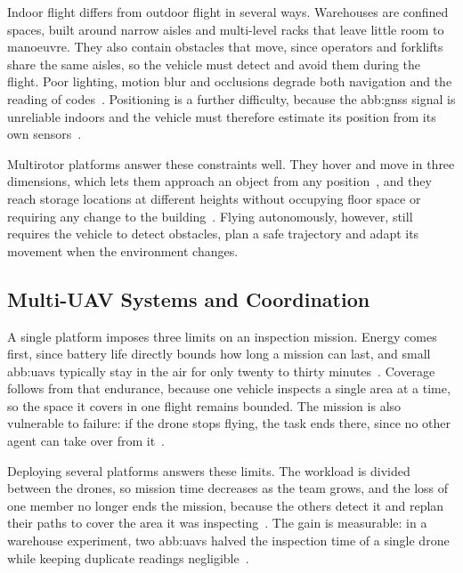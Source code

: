 Indoor flight differs from outdoor flight in several ways. Warehouses are
confined spaces, built around narrow aisles and multi-level racks that leave
little room to manoeuvre. They also contain obstacles that move, since operators
and forklifts share the same aisles, so the vehicle must detect and avoid them
during the flight. Poor lighting, motion blur and occlusions degrade both
navigation and the reading of codes~\cite{pore2026drone, pore2026uavqr}.
Positioning is a further difficulty, because the \gls{abb:gnss} signal is
unreliable indoors and the vehicle must therefore estimate its position from its
own sensors~\cite{chang2023review}.

Multirotor platforms answer these constraints well. They hover and move in three
dimensions, which lets them approach an object from any
position~\cite{mohsan2023unmanned}, and they reach storage locations at
different heights without occupying floor space or requiring any change to the
building~\cite{pore2026uavqr}. Flying autonomously, however, still requires the
vehicle to detect obstacles, plan a safe trajectory and adapt its movement when
the environment changes.


\subsection{Multi-UAV Systems and Coordination}%
\label{subsec:bg:uav-multi}

A single platform imposes three limits on an inspection mission. Energy comes
first, since battery life directly bounds how long a mission can last, and small
\glspl{abb:uav} typically stay in the air for only twenty to thirty
minutes~\cite{mohsan2023unmanned}. Coverage follows from that endurance, because
one vehicle inspects a single area at a time, so the space it covers in one
flight remains bounded. The mission is also vulnerable to failure: if the drone
stops flying, the task ends there, since no other agent can take over from
it~\cite{chandran2024network}.

Deploying several platforms answers these limits. The workload is divided between
the drones, so mission time decreases as the team grows, and the loss of one
member no longer ends the mission, because the others detect it and replan their
paths to cover the area it was inspecting~\cite{chandran2024network}. The gain is
measurable: in a warehouse experiment, two \glspl{abb:uav} halved the inspection
time of a single drone while keeping duplicate readings
negligible~\cite{pore2026uavqr}.

